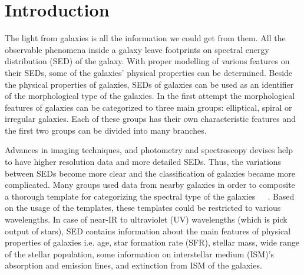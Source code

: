 \section{Introduction}
\label{sec: intro}
The light from galaxies is all the information we could get from them. 
All the observable phenomena inside a galaxy leave footprints on spectral energy distribution (SED) of the galaxy.
With proper modelling of various features on their SEDs, some of the galaxies' physical properties can be determined.
Beside the physical properties of galaxies, SEDs of galaxies can be used as an identifier of the morphological type of the galaxies. %
In the first attempt the morphological features of galaxies can be categorized to three main groups: elliptical, spiral or irregular galaxies.
Each of these groups has their own characteristic features and the first two groups can be divided into many branches.

Advances in imaging techniques, and photometry and spectroscopy devises help to have higher resolution data and more detailed SEDs. 
Thus, the variations between SEDs become more clear and the classification of galaxies became more complicated.
Many groups used data from nearby galaxies in order to composite a thorough template for categorizing the spectral type of the galaxies~\citep[e.g.][]{Kinney93}~\citep[][hereafter K96]{Kinney96}~\citep[][]{Bershady00,Mannucci01}.
Based on the usage of the templates, these templates could be restricted to various wavelengths.
In case of near-IR to ultraviolet (UV) wavelengths (which is pick output of stars), SED contains information about the main features of physical properties of galaxies i.e. age, star formation rate (SFR), stellar mass, wide range of the stellar population, some information on interstellar medium (ISM)'s absorption and emission lines, and extinction from ISM of the galaxies.

